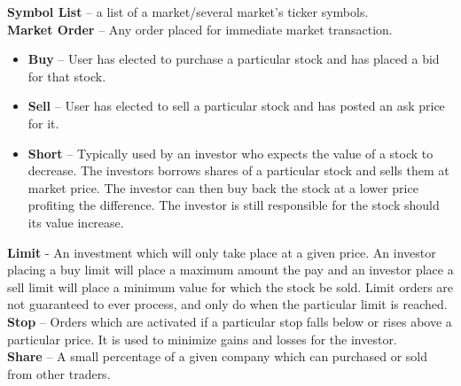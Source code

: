 {\textbf{Symbol List} -- a list of a market/several market's ticker symbols.\\


\textbf{Market Order} -- Any order placed for immediate market transaction.\\

\begin{itemize}
    \item \textbf{Buy} -- User has elected to purchase a particular stock and has placed
    a bid for that stock.\\

    \item \textbf{Sell} -- User has elected to sell a particular stock and has posted an
    ask price for it.\\

    \item \textbf{Short} -- Typically used by an investor who expects the value of
    a stock to decrease. The investors borrows shares of a particular stock and sells
    them at market price. The investor can then buy back the stock at a lower price
    profiting the difference. The investor is still responsible for the stock should
    its value increase.\cite{inv:short}\\
    \end{itemize}

\textbf{Limit} - An investment which will only take place at a given price. An
investor placing a buy limit will place a maximum amount the pay and an investor
place a sell limit will place a minimum value for which the stock be sold. Limit
orders are not guaranteed to ever process, and only do when the particular limit
is reached.\cite{inv:limit}\\

\textbf{Stop} -- Orders which are activated if a particular stop falls below or
rises above a particular price. It is used to minimize gains and losses for the
investor.\cite{inv:stop}\\

\textbf{Share} -- A small percentage of a given company which can purchased or
sold from other traders.\\
}
